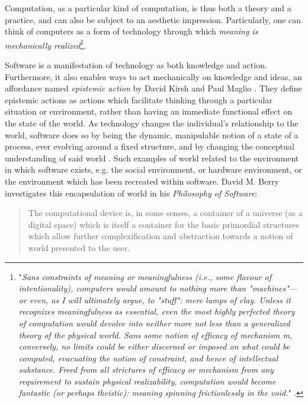 Computation, as a particular kind of computation, is thus both a theory and a practice, and can also be subject to an aesthetic impression. Particularly, one can think of computers as a form of technology through which \emph{meaning is mechanically realized}\footnote{"\emph{\emph{Sans} constraints of meaning or meaningfulness (i.e., some flavour of intentionality), computers would amount to nothing more than "machines"—or even, as I will ultimately argue, to "stuff": mere lumps of clay. Unless it recognizes meaningfulness as essential, even the most highly perfected theory of computation would devolve into neither more not less than a generalized theory of the physical world. \emph{Sans} some notion of efficacy of mechanism m, conversely, no limits could be either discerned or imposed on what could be computed, evacuating the notion of constraint, and hence of intellectual substance. Freed from all strictures of efficacy or mechanism from any requirement to sustain physical realizability, computation would become fantastic (or perhaps theistic): meaning spinning frictionlessly in the void.}"  \citep{smith_aos_2016}.}.

Software is a manifestation of technology as both knowledge and action. Furthermore, it also enables ways to act mechanically on knowledge and ideas, an affordance named \emph{epistemic action} by David Kirsh and Paul Maglio \citep{kirsh_distinguishing_1994}. They define epistemic actions as actions which facilitate thinking through a particular situation or environment, rather than having an immediate functional effect on the state of the world. As technology changes the individual's relationship to the world, software does so by being the dynamic, manipulable notion of a state of a process, ever evolving around a fixed structure, and by changing the conceptual understanding of said world \citep{rapaport_philosophy_2005}. Such examples of world related to the environment in which software exists, e.g. the social environment, or hardware environment, or the environment which has been recreated within software. David M. Berry investigates this encapsulation of world in his \emph{Philosophy of Software}:

\begin{quote}
    The computational device is, in some senses, a container of a universe (as a digital space) which is itself a container for the basic primordial structures which allow further complexification and abstraction towards a notion of world presented to the user. \citep{berry_philosophy_2011}
\end{quote}

